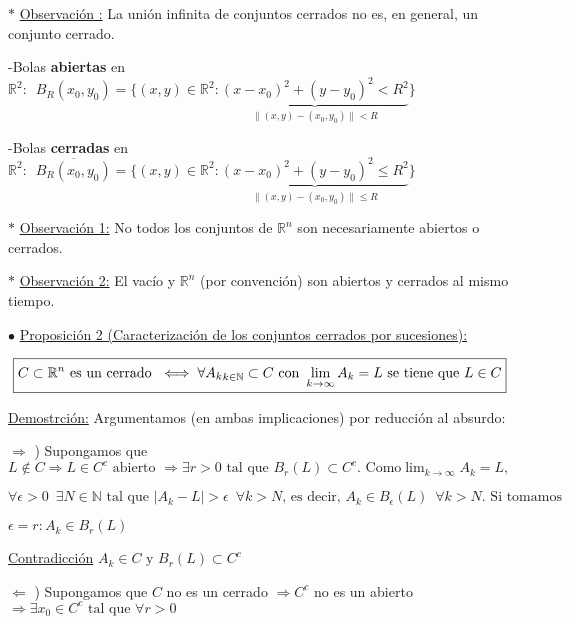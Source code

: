 \documentclass[10pt, titlepage]{article}
\newcommand{\R}{\mathbb{R}}
\newcommand{\N}{\mathbb{N}}
\newcommand{\spac}{\, \, \,}
\newcommand{\proposicion}[1][\!\!]{\noindent$\bullet$ \underline{Proposición #1:} }
\newcommand{\observacion}[1][\!\!]{\noindent$\ast$ \underline{Observación #1:} }
\begin{document}
\observacion La unión infinita de conjuntos cerrados no es, en general, un conjunto cerrado.
\vspace{5mm}

-Bolas \textbf{abiertas} en $\R^2: \spac B_R (x_0, y_0) = \{ (x, y) \in \R^2 : \underbrace{(x-x_0)^2 + (y -
 y_0)^2 < R^2}_{\| (x, y) - (x_0, y_0)\| <R}\}$
\vspace{3mm}

-Bolas \textbf{cerradas} en $\R^2:  \spac \overline{B_R (x_0, y_0)} = \{(x , y) \in \R^2 : \underbrace{(x -
 x_0)^2 + (y - y_0)^2 \leq R^2}_{\|(x, y) - (x_0, y_0)\| \leq R}\}$
\vspace{3mm}

\observacion[1] No todos los conjuntos de $\R^n$ son necesariamente abiertos o cerrados.
\vspace{5mm}

\observacion[2] El vacío y $\R^n$ (por convención) son abiertos y cerrados al
 mismo tiempo.
\vspace{5mm}

\proposicion[2 (Caracterización de los conjuntos cerrados por sucesiones)]
\vspace{3mm}

\[
\boxed{C \subset \R^n \text{ es un cerrado } \iff \forall {A_k}_{k \in \N} \subset C \text{ con }
 \displaystyle \lim_{k \to \infty}^{} A_k = L \text{ se tiene que } \\ L \in C}
\]
\vspace{3mm}

\underline{Demostrción:} Argumentamos (en ambas implicaciones) por reducción al absurdo:
\vspace{3mm}

$\Rightarrow$ ) Supongamos que $L \not\in C \Rightarrow L \in C^c \text{ abierto } \Rightarrow \exists 
r > 0 \text{ tal que } B_r (L) \subset C^c \text{. Como} \displaystyle \lim_{k \to \infty} A_k = L,$

$\forall \epsilon > 0  \spac \exists N \in \N \text{ tal que }|A_k - L| > \epsilon \spac \forall k > N \text{, es 
decir, }A_k \in B_\epsilon (L) \spac \forall k>N \text{. Si tomamos }$

$\epsilon = r : A_k \in B_r (L)$
\vspace{3mm}

\underline{Contradicción} $A_k \in C \text{ y } B_r (L) \subset C^c$
\vspace{3mm}

$\Leftarrow$ ) Supongamos que $C$ no es un cerrado $\Rightarrow C^c$ no es un abierto $\Rightarrow \exists x_0 \in C^c \text{ tal que } \forall r>0$
\end{document}
